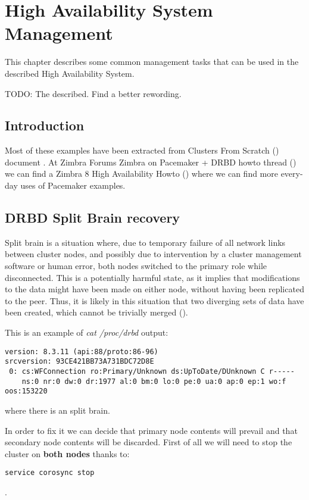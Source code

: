 

\chapter{High Availability System Management}
\label{chap:ha-system-management}
This chapter describes some common management tasks that can be used in the described High Availability System.

TODO: The described. Find a better rewording.

\section {Introduction}
Most of these examples have been extracted from Clusters From Scratch (\cite{ClustersFromScratch}) document . At Zimbra Forums Zimbra on Pacemaker + DRBD howto thread (\cite{ZForumsTaer}) we can find a Zimbra 8 High Availability Howto (\cite{TaerHowtoHAZimbra8}) where we can find more every-day uses of Pacemaker examples.

\section {DRBD Split Brain recovery}

Split brain is a situation where, due to temporary failure of all network links between cluster nodes, and possibly due to intervention by a cluster management software or human error, both nodes switched to the primary role while disconnected. This is a potentially harmful state, as it implies that modifications to the data might have been made on either node, without having been replicated to the peer. Thus, it is likely in this situation that two diverging sets of data have been created, which cannot be trivially merged (\cite{DrbdSplitBrain}).

This is an example of \textit{cat /proc/drbd} output:
\begin{verbatim}
version: 8.3.11 (api:88/proto:86-96)
srcversion: 93CE421BB73A731BDC72D8E 
 0: cs:WFConnection ro:Primary/Unknown ds:UpToDate/DUnknown C r-----
    ns:0 nr:0 dw:0 dr:1977 al:0 bm:0 lo:0 pe:0 ua:0 ap:0 ep:1 wo:f oos:153220
\end{verbatim}
where there is an split brain.

In order to fix it we can decide that primary node contents will prevail and that secondary node contents will be discarded. First of all we will need to stop the cluster on \textbf{both nodes} thanks to:
\begin{verbatim}
service corosync stop
\end{verbatim}
.

